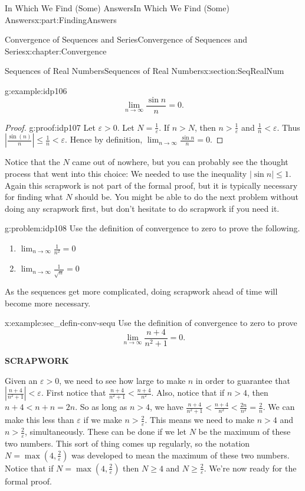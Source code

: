 \documentclass[oneside,10pt,]{book}
\newcommand{\terminology}[1]{\textbf{#1}}
\numberwithin{equation}{section}
\newcommand{\abs}[1]{\left|#1\right|}
\newcommand{\eps}{\varepsilon}
\newcommand{\lt}{<}
\begin{document}
\begin{partptx}{In Which We Find (Some) Answers}{}{In Which We Find (Some) Answers}{}{}{x:part:FindingAnswers}
\begin{chapterptx}{Convergence of Sequences and Series}{}{Convergence of Sequences and Series}{}{}{x:chapter:Convergence}
\begin{sectionptx}{Sequences of Real Numbers}{}{Sequences of Real Numbers}{}{}{x:section:SeqRealNum}
\begin{example}{}{g:example:idp106}
\begin{equation*}
\lim_{n\rightarrow\infty}\frac{\sin n}{n}=0\text{.}
\end{equation*}
%
\end{example}
\begin{proof}{}{g:proof:idp107}
Let \(\eps>0\). Let \(N=\frac{1}{\eps}\). If \(n>N\), then \(n>\frac{1}{\eps}\) and \(\frac{1}{n}\lt \eps\). Thus \(\abs{\frac{\sin(n)}{n}}\leq\frac{1}{n}\lt \eps\). Hence by definition, \(\lim_{n\rightarrow\infty}\frac{\sin n}{n}=0\).%
\end{proof}
Notice that the \(N\) came out of nowhere, but you can probably see the thought process that went into this choice: We needed to use the inequality \(\abs{\sin n}\leq 1\). Again this scrapwork is not part of the formal proof, but it is typically necessary for finding what \(N\) should be. You might be able to do the next problem without doing any scrapwork first, but don't hesitate to do scrapwork if you need it.%
\begin{problem}{}{g:problem:idp108}%
 Use the definition of convergence to zero to prove the following.%
\begin{enumerate}[font=\bfseries,label=(\alph*),ref=\alph*]
\item{}\(\displaystyle\lim_{n\rightarrow\infty}\frac{1}{n^2}=0\)%
\item{}\(\displaystyle\lim_{n\rightarrow\infty}\frac{1}{\sqrt{n}}=0\)%
\end{enumerate}
\end{problem}
As the sequences get more complicated, doing scrapwork ahead of time will become more necessary.%
\begin{example}{}{x:example:sec_defin-conv-sequ}%
Use the definition of convergence to zero to prove%
\begin{equation*}
\lim_{n\rightarrow\infty}\frac{n+4}{n^2+1}=0\text{.}
\end{equation*}
%
\par
\terminology{SCRAPWORK}%
\par
Given an \(\eps>0\), we need to see how large to make \(n\) in order to guarantee that \(|\frac{n+4}{n^2+1}|\lt \eps\). First notice that \(\frac{n+4}{n^2+1}\lt \frac{n+4}{n^2}\). Also, notice that if \(n>4\), then \(n+4\lt n+n=2n\). So as long as \(n>4\), we have \(\frac{n+4}{n^2+1}\lt \frac{n+4}{n^2}\lt \frac{2n}{n^2}=\frac{2}{n}\). We can make this less than \(\eps\) if we make \(n>\frac{2}{\eps}\). This means we need to make \(n>4\) and \(n>\frac{2}{\eps}\), simultaneously. These can be done if we let \(N\) be the maximum of these two numbers. This sort of thing comes up regularly, so the notation \(N=\max\left(4,\frac{2}{\eps}\right)\) was developed to mean the maximum of these two numbers. Notice that if \(N=\max\left(4, \frac{2}{\eps}\right)\) then \(N\geq 4\) and \(N\geq\frac{2}{\eps}\). We're now ready for the formal proof.%

\end{example}
\end{sectionptx}
\end{chapterptx}
\end{partptx}
\end{document}
